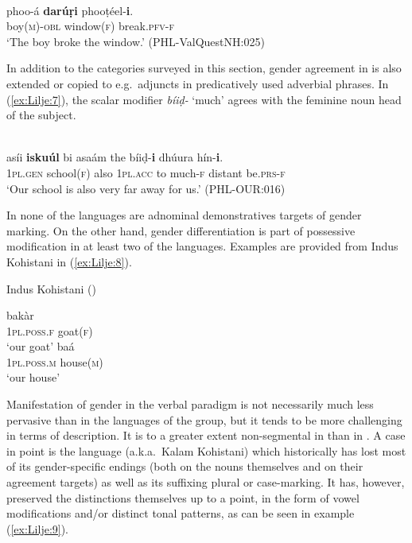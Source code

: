 \documentclass[output=collectionpaper]{langsci/langscibook}
\begin{document}
\ea
\label{ex:Lilje:6}
\\
\gll phoo-á \textbf{darúṛi} phooṭéel-\textbf{i}.     \\
boy(\textsc{m})\textsc{{}-obl} window(\textsc{f}) break.\textsc{pfv-}\textsc{f}     \\
\glt `The boy broke the window.' (PHL-ValQuestNH:025)
\z

In addition to the categories surveyed in this section, gender agreement in  is also extended or copied to e.g.\ adjuncts in predicatively used adverbial phrases. In (\ref{ex:Lilje:7}), the scalar modifier \textit{bíiḍ-} `much' agrees with the feminine noun head of the subject.

\ea
\label{ex:Lilje:7}
\\
\gll asíi \textbf{iskuúl} bi asaám the bíiḍ-\textbf{i} dhúura hín-\textbf{i}.\\
\textsc{1pl.gen} school(\textsc{f}) also \textsc{1pl.acc} to much-\textsc{f} distant be.\textsc{prs-}\textsc{f}\\
\glt `Our school is also very far away for us.' (PHL-OUR:016)\\
\z

In none of the  languages are adnominal demonstratives targets of gender marking. On the other hand, gender differentiation is part of possessive modification in at least two of the languages. Examples are provided from Indus Kohistani in (\ref{ex:Lilje:8}).

\ea
\label{ex:Lilje:8}
Indus Kohistani (\citealt[62, 82]{Lubberger2014})\\
\begin{xlist}
\ex
{} bakàr\\
\textsc{1pl.poss.f} goat(\textsc{f}) \\
\glt `our goat'
\ex
{} baá\\
\textsc{1pl.poss.m} house(\textsc{m})\\
\glt `our house'\\
\end{xlist}
\z

Manifestation of gender in the verbal paradigm is not necessarily much less pervasive than in the languages of the  group, but it tends to be more challenging in terms of description. It is to a greater extent non-segmental in  than in . A case in point is the  language  (a.k.a.\ Kalam Kohistani) which historically has lost most of its gender-specific endings (both on the nouns themselves and on their agreement targets) as well as its suffixing plural or case-marking. It has, however, preserved the distinctions themselves up to a point, in the form of vowel modifications and/or distinct tonal patterns, as can be seen in example (\ref{ex:Lilje:9}).
\end{document}
